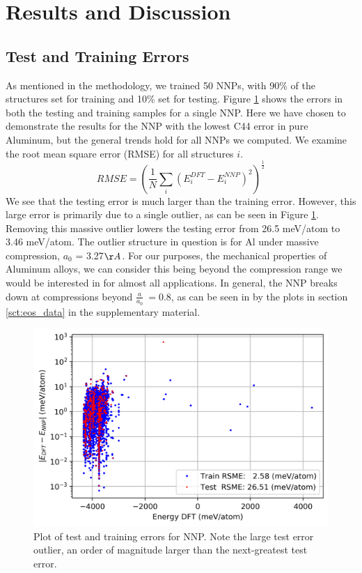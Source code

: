 \documentclass{article}
\begin{document}
\section{Results and Discussion}

\subsection{Test and Training Errors}

As mentioned in the methodology, we trained 50 NNPs, with 90\% of the structures set for training and 10\% set for testing.
Figure \ref{fig:rsme_plot} shows the errors in both the testing and training samples for a single NNP.
Here we have chosen to demonstrate the results for the NNP with the lowest C44 error in pure Aluminum, but the general trends hold for all NNPs we computed. We examine the root mean square error (RMSE) for all structures $i$.
\begin{equation}
    RMSE = (\frac{1}{N}\sum_i (E^{DFT}_i - E^{NNP}_i)^2)^\frac{1}{2}
\end{equation}
We see that the testing error is much larger than the training error.
However, this large error is primarily due to a single outlier, as can be seen in  Figure \ref{fig:rsme_plot}.
Removing this massive outlier lowers the testing error from 26.5 meV/atom to 3.46 meV/atom.
The outlier structure in question is for Al under massive compression, $a_0$ = 3.27$\AA$.
For our purposes, the mechanical properties of Aluminum alloys, we can consider this being beyond the compression range we would be interested in for almost all applications.
In general, the NNP breaks down at compressions beyond $\frac{a}{a_0} ~= 0.8$, as can be seen in by the plots in section \ref{sct:eos_data} in the supplementary material. 

\begin{figure}[H]%
\centering%
\includegraphics[width=1.0\textwidth,center]{figures/plot_nnperrors.png}%
\caption{Plot of test and training errors for NNP.
Note the large test error outlier, an order of magnitude larger than the next-greatest test error. }%
\label{fig:rsme_plot}
\end{figure}
\end{document}
